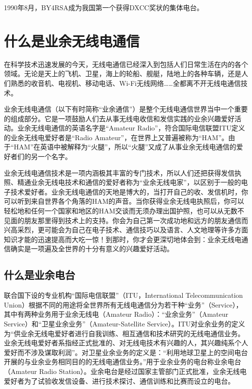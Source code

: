 \documentclass[12pt,UTF8]{ctexbook}
\begin{document}
1990年8月，BY4RSA成为我国第一个获得DXCC奖状的集体电台。

\chapter{什么是业余无线电通信}

在科学技术迅速发展的今天，无线电通信已经深入到包括人们日常生活在内的各个领域。无论是天上的飞机、卫星，海上的轮船、舰艇，陆地上的各种车辆，还是人们熟悉的收音机、电视机、移动电话、Wi-Fi无线网络……全都离不开无线电通信技术。

业余无线电通信（以下有时简称“业余通信”）是整个无线电通信世界当中一个重要的组成部分。它是一项鼓励人们去从事无线电收信和发信实践的业余兴趣爱好活动。业余无线电通信的英语名字是“Amateur Radio”，符合国际电信联盟ITU定义的业余无线电爱好者是“Radio Amateur”，在世界上又普遍被称为“HAM”。由于“HAM”在英语中被解释为“火腿”，所以“火腿”又成了从事业余无线电通信的爱好者们的另一个名字。

业余无线电通信技术是一项内涵极其丰富的专门技术，所以人们还把获得发信执照、精通业余无线电技术和通信的爱好者称为“业余无线电家”，以区别于一般的电子技术爱好者。业余无线电通信的天地是博大的，当打开自己的收、发信机时，你可以听到来自世界各个角落的HAM的声音。当你获得业余无线电执照后，你可以轻松地和任何一个国家和地区的HAM交谈而无须办理出国护照，也可以从无数不见面的朋友那里得到技术上的支持。你会为自己第一次成功地和远方的朋友通信而兴高采烈，更可能会为自己在电子技术、通信技巧以及语言、人文地理等许多方面知识才能的迅速提高而大吃一惊！到那时，你才会更深切地体会到：业余无线电通信确实是一项遍及全世界的十分有意义的兴趣爱好活动。

\section{什么是业余电台}

联合国下设的专业机构“国际电信联盟”（ITU，International Telecommunication Union）根据不同的用途将全世界所有无线电通信分为若干种“业务”（Service），其中有两种业务用于业余无线电（Amateur Radio）：“业余业务”（Amateur Service）和“卫星业余业务”（Amateur-Satellite Service）。ITU对业余业务的定义为“供业余无线电爱好者进行自我训练、相互通信和技术研究的无线电通信业务。业余无线电爱好者系指经正式批准的、对无线电技术有兴趣的人，其兴趣纯系个人爱好而不涉及谋取利润”。对卫星业余业务的定义是：“利用地球卫星上的空间电台开展的与业余业务相同目的的无线电通信业务。”用于业余业务的电台称业余电台（Amateur Radio Station）。业余电台是经过国家主管部门正式批准，业余无线电爱好者为了试验收发信设备、进行技术探讨、通信训练和比赛而设立的电台。
\end{document}
